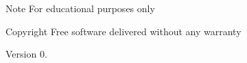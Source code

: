 \begin{DoxyNote}{Note}
For educational purposes only 
\end{DoxyNote}
\begin{DoxyCopyright}{Copyright}
Free software delivered without any warranty 
\end{DoxyCopyright}
\begin{DoxyVersion}{Version}
0.  
\end{DoxyVersion}
